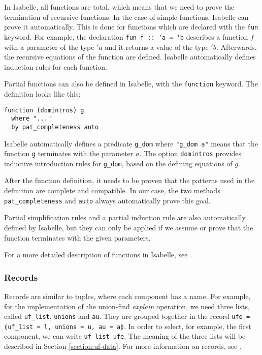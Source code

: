 In Isabelle, all functions are total, which means that we need to prove the termination of recursive functions.
In the case of simple functions, Isabelle can prove it automatically.
This is done for functions which are declared with the \lstinline{fun} keyword.
For example, the declaration \lstinline|fun f :: 'a ⇒ 'b| describes a function $f$ with a parameter of the type $'a$ and it returns a value of the type $'b$.
Afterwards, the recursive equations of the function are defined.
Isabelle automatically defines induction rules for each function.

Partial functions can also be defined in Isabelle, with the \lstinline{function} keyword.
The definition looks like this:

\begin{lstlisting}
function (domintros) g
  where "..."
  by pat_completeness auto
\end{lstlisting}

Isabelle automatically defines a predicate \lstinline|g_dom| where \lstinline{"g_dom a"} means that the function \lstinline|g| terminates with the parameter $a$.
The option \lstinline{domintros} provides inductive introduction rules for \lstinline|g_dom|, based on the defining equations of $g$.

After the function definition, it needs to be proven that the patterns used in the definition are complete and compatible. In our case, the two methods \lstinline|pat_completeness| and \lstinline|auto| always automatically prove this goal.

Partial simplification rules and a partial induction rule are also automatically defined by Isabelle, but they can only be applied if we assume or prove that the function terminates with the given parameters.

For a more detailed description of functions in Isabelle, see \cite{functions}.

\subsubsection{Records}

Records are similar to tuples, where each component has a name. For example, for the implementation of the union-find \emph{explain} operation, we need three lists, called \lstinline|uf_list|, \lstinline|unions| and \lstinline|au|.
They are grouped together in the record \lstinline{ufe = ⦇uf_list = l, unions = u, au = a⦈}. In order to select, for example, the first component, we can write \lstinline{uf_list ufe}. The meaning of the three lists will be described in Section \ref{section:uf-data}.
For more information on records, see \cite[chapter 8.3]{isabelle}.


